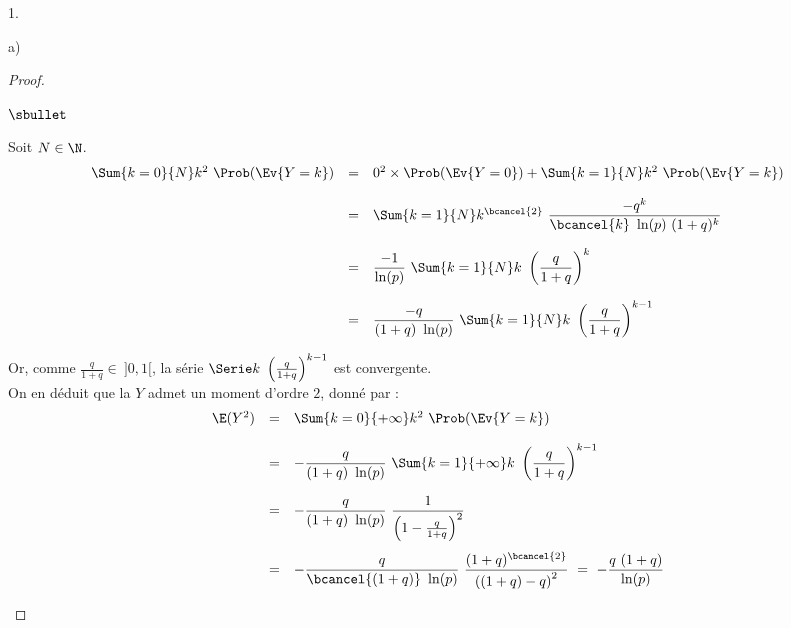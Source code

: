 \begin{noliste}{1.}
\begin{noliste}{a)}
\begin{proof}
\begin{noliste}{$\sbullet$}
      \item Soit $N \in \N$.
        \[
        \begin{array}{rcl}
          \Sum{k = 0}{N} k^2 \ \Prob(\Ev{Y = k}) & = & 0^2 \times
          \Prob(\Ev{Y = 0}) + \Sum{k = 1}{N} k^2 \ \Prob(\Ev{Y = k}) 
          \\[.4cm]
          & = & \Sum{k = 1}{N} k^{\bcancel{2}} \ \dfrac{-q^k}{\bcancel{k}
            \ \ln(p) \ (1+q)^k} 
          \\[.6cm]
          & = & \dfrac{-1}{\ln(p)} \ \Sum{k = 1}{N} k \ 
          \left(\dfrac{q}{1+q} \right)^k 
          \\[.6cm]
          & = & \dfrac{-q}{(1+q) \ \ln(p)} \ \Sum{k = 1}{N} k \ 
          \left(\dfrac{q}{1+q} \right)^{k-1} 
        \end{array}
        \]


        \newpage


      \item Or, comme $\frac{q}{1+q} \in \ ]0, 1[$, la série $\Serie k
        \ \left( \frac{q}{1+q} \right)^{k-1}$ est convergente.\\
        On en déduit que la \var $Y$ admet un moment d'ordre $2$,
        donné par :
        \[
        \begin{array}{rcl}
          \E(Y^2) & = & \Sum{k=0}{+\infty} k^2 \ \Prob(\Ev{Y = k}) 
          \\[.4cm]
          & = & -\dfrac{q}{(1+q) \ \ln(p)} \ \Sum{k=1}{+\infty} k \ \left(
            \dfrac{q}{1+q} \right)^{k-1} 
          \\[.6cm]
          & = & -\dfrac{q}{(1+q) \ \ln(p)} \ \dfrac{1}{\left( 1 -
              \frac{q}{1+q} \right)^2} 
          \\[.8cm]
          & = & -\dfrac{q}{\bcancel{(1+q)} \ \ln(p)} \ \dfrac{(1 +
            q)^{\bcancel{2}}}{\left( (1+q) - q \right)^2} 
          \ = \ - \dfrac{q \ (1+q)}{\ln(p)}
        \end{array}
        \]


\end{noliste}
\end{proof}
\end{noliste}
\end{noliste}
